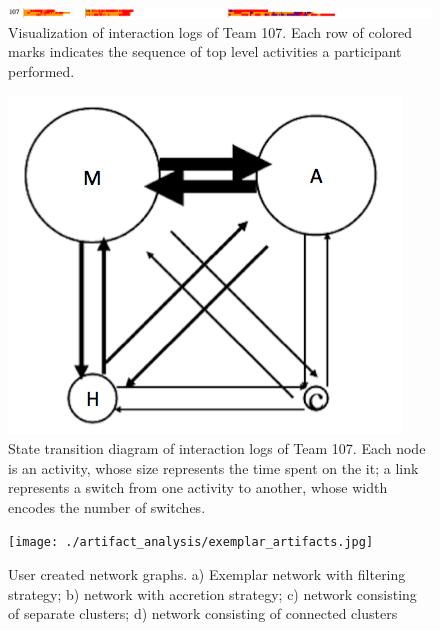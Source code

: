 \documentclass[]{article}
\begin{document}
\begin{figure}
\centering
\includegraphics{./Log_analysis/action_sequence_vis/G107.png}
\caption{Visualization of interaction logs of Team 107. Each row of
colored marks indicates the sequence of top level activities a
participant performed.}\label{fig:sequence}
\end{figure}

\begin{figure}
\centering
\includegraphics{./Log_analysis/state_transition/activity_transition-G107.png}
\caption{State transition diagram of interaction logs of Team 107. Each
node is an activity, whose size represents the time spent on the it; a
link represents a switch from one activity to another, whose width
encodes the number of switches.}\label{fig:transition}
\end{figure}

\begin{figure}
\centering
\texttt{[image: ./artifact\_analysis/exemplar\_artifacts.jpg]}
\caption{User created network graphs. a) Exemplar network with filtering
strategy; b) network with accretion strategy; c) network consisting of
separate clusters; d) network consisting of connected
clusters}\label{fig:network}
\end{figure}
\end{document}
